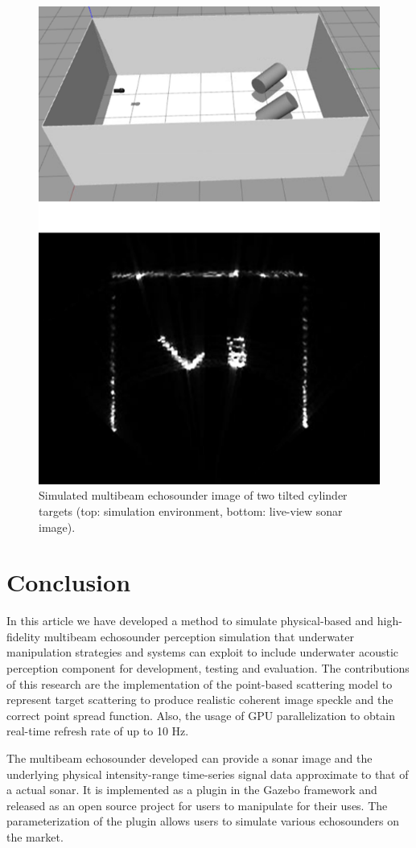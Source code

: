 \documentclass[utf8]{frontiersSCNS} %
\begin{document}
\begin{figure}[t]
  \centering
  \includegraphics[width=\columnwidth]{images/two_cylinder_angled.png}
  \caption{Simulated multibeam echosounder image of two tilted cylinder targets (top: simulation environment, bottom: live-view sonar image).}
  \label{f:two_cylinder_angled}
\end{figure} 

\section{Conclusion}
In this article we have developed a method to simulate physical-based and high-fidelity multibeam echosounder perception simulation that underwater manipulation strategies and systems can exploit to include underwater acoustic perception component for development, testing and evaluation. The contributions of this research are the implementation of the point-based scattering model to represent target scattering to produce realistic coherent image speckle and the correct point spread function. Also, the usage of GPU parallelization to obtain real-time refresh rate of up to 10 Hz.

The multibeam echosounder developed can provide a sonar image and the underlying physical intensity-range time-series signal data approximate to that of a actual sonar. It is implemented as a plugin in the Gazebo framework and released as an open source project for users to manipulate for their uses. The parameterization of the plugin allows users to simulate various echosounders on the market.



\end{document}
